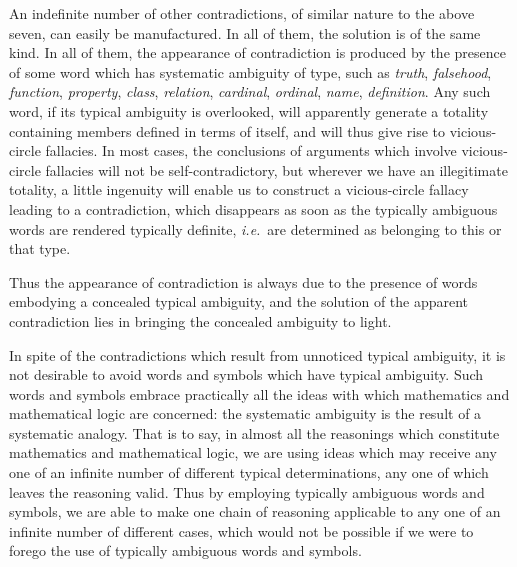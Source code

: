 \documentclass[letterpaper,12pt,openany,leqno]{book}
\newcommand{\pagefirst}[1]{\marginnote[\boxed{\text{#1}}]{\boxed{\text{#1}}}}
\begin{document}
An indefinite number of other contradictions, of similar nature to the above seven, can easily be manufactured. In all of them, the solution is of the same kind. In all of them, the appearance of contradiction is produced by the presence of some word which has systematic ambiguity of type, such as \textit{truth}, \textit{falsehood}, \textit{function}, \textit{property}, \textit{class}, \textit{relation}, \textit{cardinal}, \textit{ordinal}, \textit{name}, \textit{definition}. Any such word, if its typical ambiguity is overlooked, will apparently generate a totality containing members defined in terms of itself, and will thus give rise to vicious-circle fallacies. In most cases, the conclusions of arguments which involve vicious-circle fallacies will not be self-contradictory, but wherever we have an illegitimate totality, a little ingenuity will enable us to construct a vicious-circle fallacy leading to a contradiction, which disappears as soon as the typically ambiguous words are rendered typically definite, \textit{i.e.}\ are determined as belonging to this or that type.

Thus the appearance of contradiction is always due to the presence of words embodying a concealed typical ambiguity, and the solution of the apparent contradiction lies in bringing the concealed ambiguity to light.

\pagefirst{68} In spite of the contradictions which result from unnoticed typical ambiguity, it is not desirable to avoid words and symbols which have typical ambiguity. Such words and symbols embrace practically all the ideas with which mathematics and mathematical logic are concerned: the systematic ambiguity is the result of a systematic analogy. That is to say, in almost all the reasonings which constitute mathematics and mathematical logic, we are using ideas which may receive any one of an infinite number of different typical determinations, any one of which leaves the reasoning valid. Thus by employing typically ambiguous words and symbols, we are able to make one chain of reasoning applicable to any one of an infinite number of different cases, which would not be possible if we were to forego the use of typically ambiguous words and symbols.
\end{document}
